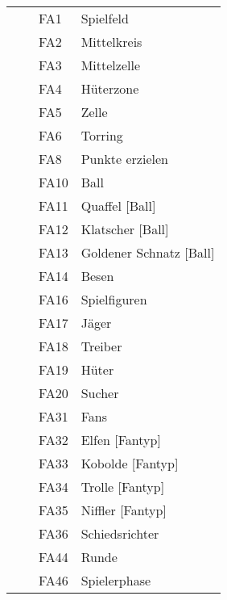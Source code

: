 \begin{figure}[H]
\begin{tabular}{|p{} p{} p{} p{}|}
        & & FA1 & Spielfeld\\
        & & FA2 & Mittelkreis\\
        & & FA3 & Mittelzelle\\
        & & FA4 & Hüterzone\\
        & & FA5 & Zelle\\
        & & FA6 & Torring\\
        & & FA8 & Punkte erzielen\\
        & & FA10 & Ball\\
        & & FA11 & Quaffel [Ball]\\
        & & FA12 & Klatscher [Ball]\\
        & & FA13 & Goldener Schnatz [Ball]\\
        & & FA14 & Besen\\
        & & FA16 & Spielfiguren\\
        & & FA17 & Jäger\\
        & & FA18 & Treiber\\
        & & FA19 & Hüter\\
        & & FA20 & Sucher\\
        & & FA31 & Fans\\
        & & FA32 & Elfen [Fantyp]\\
        & & FA33 & Kobolde [Fantyp]\\
        & & FA34 & Trolle [Fantyp]\\
        & & FA35 & Niffler [Fantyp]\\
        & & FA36 & Schiedsrichter\\
        & & FA44 & Runde\\
        & & FA46 & Spielerphase\\\hline
    \end{tabular}
\end{figure}






